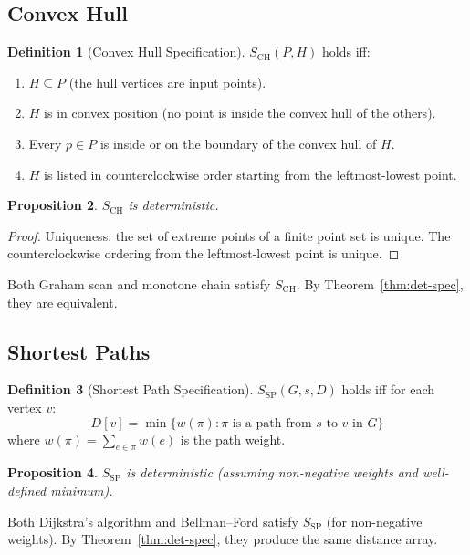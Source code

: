 \documentclass[11pt,a4paper]{report}
\theoremstyle{definition}
\newtheorem{definition}{Definition}[chapter]
\theoremstyle{plain}
\newtheorem{proposition}[definition]{Proposition}
\begin{document}
\subsection{Convex Hull}

\begin{definition}[Convex Hull Specification]
$S_{\mathrm{CH}}(P, H)$ holds iff:
\begin{enumerate}
  \item $H \subseteq P$ (the hull vertices are input points).
  \item $H$ is in convex position (no point is inside the convex
    hull of the others).
  \item Every $p \in P$ is inside or on the boundary of the convex
    hull of $H$.
  \item $H$ is listed in counterclockwise order starting from the
    leftmost-lowest point.
\end{enumerate}
\end{definition}

\begin{proposition}
$S_{\mathrm{CH}}$ is deterministic.
\end{proposition}

\begin{proof}
Uniqueness: the set of extreme points of a finite point set is unique.
The counterclockwise ordering from the leftmost-lowest point is unique.
\end{proof}

Both Graham scan and monotone chain satisfy $S_{\mathrm{CH}}$.
By Theorem~\ref{thm:det-spec}, they are equivalent.

\subsection{Shortest Paths}

\begin{definition}[Shortest Path Specification]
$S_{\mathrm{SP}}(G, s, D)$ holds iff for each vertex $v$:
\[
  D[v] = \min\{w(\pi) : \pi \text{ is a path from } s \text{ to } v
    \text{ in } G\}
\]
where $w(\pi) = \sum_{e \in \pi} w(e)$ is the path weight.
\end{definition}

\begin{proposition}
$S_{\mathrm{SP}}$ is deterministic (assuming non-negative weights
and well-defined minimum).
\end{proposition}

Both Dijkstra's algorithm and Bellman--Ford satisfy $S_{\mathrm{SP}}$
(for non-negative weights).  By Theorem~\ref{thm:det-spec}, they
produce the same distance array.
\end{document}
